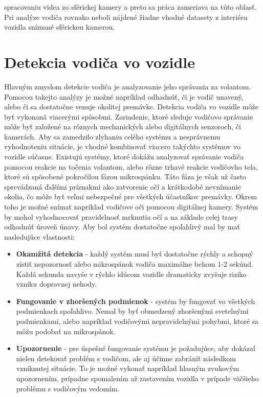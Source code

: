 \documentclass[slovak,master,dept460,male,cpp,cpdeclaration]{diploma}
\begin{document}
spracovaniu videa zo sférickej kamery a preto sa práca zameriava na túto oblasť. Pri analýze vodiča rovnako neboli nájdené žiadne vhodné datasety z interiéru vozidla snímané sférickou kamerou.

\newpage
\section{Detekcia vodiča vo vozidle}
\label{sec:Pose detection}
Hlavným zmyslom detekcie vodiča je analyzovanie jeho správania za volantom.  Pomocou takejto analýzy je možné napríklad odhadnúť, či je vodič unavený, alebo či sa dostatočne venuje okolitej premávke. Detekcia vodiča vo vozidle môže byť vykonaná viacerými spôsobmi. Zariadenie, ktoré sleduje vodičovo správanie môže byť založené na rôznych mechanických alebo digitálnych senzoroch, či kamerách. Aby sa zamedzilo zlyhaniu celého systému a nesprávnemu vyhodnoteniu situácie, je vhodné kombinovať viacero takýchto systémov vo vozidle súčasne. Existujú systémy, ktoré dokážu analyzovať správanie vodiča pomocou reakcie na točenia volantom, alebo rôzne trhavé reakcie vodičovho tela, ktoré sú spôsobené pokročilou fázou mikrospánku. Táto fáza je však už často sprevádzaná ďalšími príznakmi ako zatvorenie očí a  krátkodobé nevnímanie okolia, čo môže byť veľmi nebezpečné pre všetkých účastníkov premávky.  Okrem toho je možné snímať napríklad  vodičove oči pomocou digitálnej kamery. Systém by mohol vyhodnocovať  pravidelnosť mrknutia očí a na základe celej trasy odhadnúť úroveň únavy. Aby bol systém dostatočne spoľahlivý mal by mať nasledujúce vlastnosti:

\begin{itemize}
\item \textbf{Okamžitá detekcia} - každý systém musí byť dostatočne rýchly a schopný zistiť nepozornosť alebo mikrospánok vodiča maximálne behom 1-2 sekúnd. Každá sekunda navyše v rýchlo idúcom vozidle dramaticky zvyšuje riziko vzniku dopravnej nehody.
\item \textbf{Fungovanie v zhoršených podmienok} - systém by  fungovať vo všetkých podmienkach  spoľahlivo. Nemal by byť obmedzený zhoršenými svetelnými podmienkami, alebo napríklad vodičovými nepravidelnými pohybmi, ktoré sa môžu podobať na mikrospánok.
\item \textbf{Upozornenie} - pre úspešné fungovanie systému je požadujúce, aby dokázal nielen detekovať problém s vodičom, ale aj účinne zabrániť následkom vzniknutej situácie. To je možné vykonať napríklad hlasným zvukovým upozornením, prípadne spomalením až zastavením vozidla v prípade väčšieho problému s vodičovým vedomím. 
\end{itemize}
\end{document}

